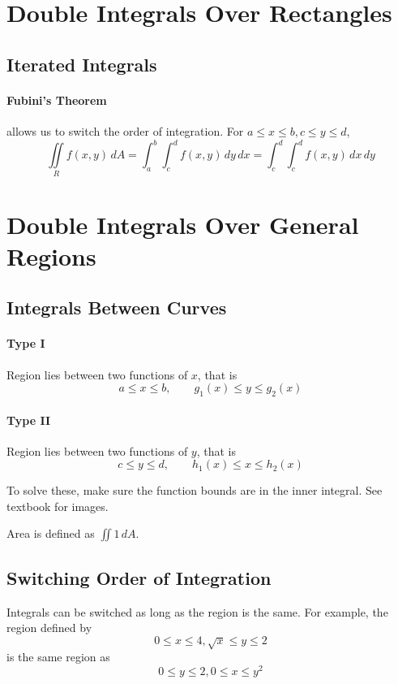 \documentclass{report}  %
\begin{document}
\setcounter{chapter}{15}
\section{Double Integrals Over Rectangles}
\subsection*{Iterated Integrals}
\paragraph{Fubini's Theorem} 
allows us to switch the order of integration. For $a \le x \le b, c \le y \le d$,
\begin{equation}
	\iint \limits_R f(x,y) \, dA = 
	\int_a^b \int_c^d f(x,y) \, dy \, dx =
	\int_c^d \int_c^d f(x,y) \, dx \, dy
\end{equation}

\section{Double Integrals Over General Regions}
\subsection*{Integrals Between Curves}
\paragraph{Type I} Region lies between two functions of $x$, that is 
$$a \le x \le b, \qquad g_1(x) \le y \le g_2(x)$$

\paragraph{Type II} Region lies between two functions of $y$, that is 
$$c \le y \le d, \qquad h_1(x) \le x \le h_2(x)$$

To solve these, make sure the function bounds are in the inner integral. 
See textbook for images.

Area is defined as $\iint 1 \, dA$.

\subsection*{Switching Order of Integration}
Integrals can be switched as long as the region is the same. 
For example, the region defined by $$0 \le x \le 4, \sqrt{x} \le y \le 2$$ is the same region as $$0 \le y \le 2, 0 \le x \le y^2$$
\end{document}
